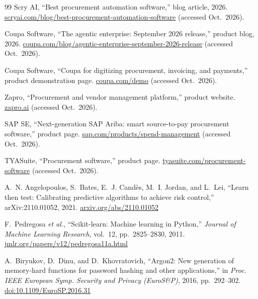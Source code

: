 \begin{thebibliography}{99}
Scry AI, ``Best procurement automation software,'' blog article, 2026. \href{https://scryai.com/blog/best-procurement-automation-software/}{scryai.com/blog/best-procurement-automation-software} (accessed Oct.~2026).

Coupa Software, ``The agentic enterprise: September 2026 release,'' product blog, 2026. \href{https://www.coupa.com/blog/agentic-enterprise-september-2026-release/}{coupa.com/blog/agentic-enterprise-september-2026-release} (accessed Oct.~2026).

Coupa Software, ``Coupa for digitizing procurement, invoicing, and payments,'' product demonstration page. \href{https://coupa.com/demo/lp_all-demand-demo-procurement-invoicing-payments}{coupa.com/demo} (accessed Oct.~2026).

Zapro, ``Procurement and vendor management platform,'' product website. \href{https://www.zapro.ai/}{zapro.ai} (accessed Oct.~2026).

SAP SE, ``Next-generation SAP Ariba: smart source-to-pay procurement software,'' product page. \href{https://www.sap.com/products/spend-management/smart-source-to-pay-procurement-software.html}{sap.com/products/spend-management} (accessed Oct.~2026).

TYASuite, ``Procurement software,'' product page. \href{https://www.tyasuite.com/procurement-software}{tyasuite.com/procurement-software} (accessed Oct.~2026).

A.~N. Angelopoulos, S.~Bates, E.~J. Cand\`es, M.~I. Jordan, and L.~Lei, ``Learn then test: Calibrating predictive algorithms to achieve risk control,'' arXiv:2110.01052, 2021. \href{https://arxiv.org/abs/2110.01052}{arxiv.org/abs/2110.01052}

F.~Pedregosa \emph{et al.}, ``Scikit-learn: Machine learning in Python,'' \emph{Journal of Machine Learning Research}, vol.~12, pp.~2825--2830, 2011. \href{https://jmlr.org/papers/v12/pedregosa11a.html}{jmlr.org/papers/v12/pedregosa11a.html}

A.~Biryukov, D.~Dinu, and D.~Khovratovich, ``Argon2: New generation of memory-hard functions for password hashing and other applications,'' in \emph{Proc. IEEE European Symp. Security and Privacy (EuroS\&P)}, 2016, pp.~292--302. \href{https://doi.org/10.1109/EuroSP.2016.31}{doi:10.1109/EuroSP.2016.31}


\end{thebibliography}
